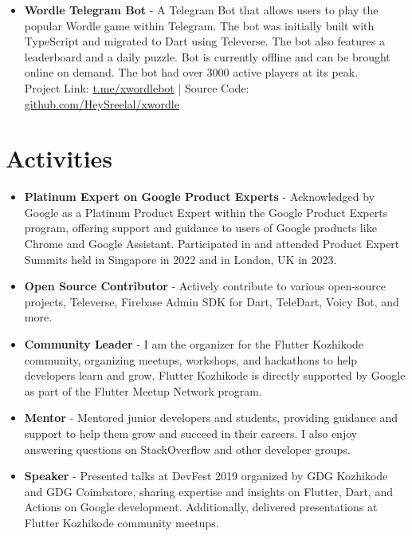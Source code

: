 \documentclass[11pt,a4paper,sans]{moderncv}
\begin{document}
\begin{itemize}[label=\textbullet]
    \item \textbf{Wordle Telegram Bot} - A Telegram Bot that allows users to play the popular Wordle game within Telegram. The bot was initially built with TypeScript and migrated to Dart using Televerse. The bot also features a leaderboard and a daily puzzle. Bot is currently offline and can be brought online on demand. The bot had over 3000 active players at its peak. \\
          Project Link: \textcolor{blue}{\href{https://t.me/xwordlebot}{t.me/xwordlebot}} | Source Code: \textcolor{blue}{\href{https://github.com/HeySreelal/xwordle}{github.com/HeySreelal/xwordle}}
\end{itemize}

\section{Activities}

\begin{itemize}[label=\textbullet]
    \item \textbf{Platinum Expert on Google Product Experts} -
          Acknowledged by Google as a Platinum Product Expert within the Google Product Experts program, offering support and guidance to users of Google products like Chrome and Google Assistant. Participated in and attended Product Expert Summits held in Singapore in 2022 and in London, UK in 2023.
    \item \textbf{Open Source Contributor} - Actively contribute to various open-source projects, Televerse, Firebase Admin SDK for Dart, TeleDart, Voicy Bot, and more.
    \item \textbf{Community Leader} - I am the organizer for the Flutter Kozhikode community, organizing meetups, workshops, and hackathons to help developers learn and grow. Flutter Kozhikode is directly supported by Google as part of the Flutter Meetup Network program.
    \item \textbf{Mentor} - Mentored junior developers and students, providing guidance and support to help them grow and succeed in their careers. I also enjoy answering questions on StackOverflow and other developer groups.
    \item \textbf{Speaker} - Presented talks at DevFest 2019 organized by GDG Kozhikode and GDG Coimbatore, sharing expertise and insights on Flutter, Dart, and Actions on Google development. Additionally, delivered presentations at Flutter Kozhikode community meetups.
\end{itemize}
\end{document}
